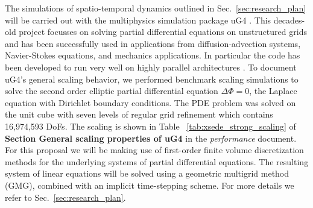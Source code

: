 \label{sec:Project-Details}
The simulations of spatio-temporal dynamics outlined in Sec.~\ref{sec:research_plan} will be carried out with the multiphysics simulation package uG4 \citep{Vogel2013, Heppner13}. This decades-old project focusses on solving partial differential equations on unstructured grids and has been successfully used in applications from diffusion-advection systems, Navier-Stokes equations, and mechanics applications. In particular the code has been developed to run very well on highly parallel architectures \citep{Vogel2013, Heppner13}. To document uG4's general scaling behavior, we performed benchmark scaling simulations to solve the second order elliptic partial differential equation $\Delta \Phi = 0$, the Laplace equation with Dirichlet boundary conditions. The PDE problem was solved on the unit cube with seven levels of regular grid refinement which contains 16,974,593 DoFs. The scaling is shown in Table ~\ref{tab:xsede_strong_scaling} of \textbf{Section General scaling properties of uG4} in the \textit{performance} document. For this proposal we will be making use of first-order finite volume discretization methods for the underlying systems of partial differential equations. The resulting system of linear equations will be solved using a geometric multigrid method (GMG), combined with an implicit time-stepping scheme. For more details we refer to Sec.~\ref{sec:research_plan}.
